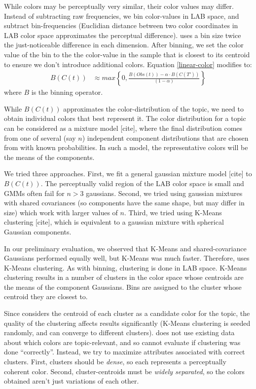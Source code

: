 While colors may be perceptually very similar, their color values may differ. Instead of subtracting raw frequencies, we bin color-values in LAB space, and subtract bin-frequencies (Euclidian distance between two color coordinates in LAB color space approximates the perceptual difference). \system uses a bin size twice the just-noticeable difference in each dimension. After binning, we set the color value of the bin to the the color-value in the sample that is closest to its centroid to ensure we don't introduce additional colors. Equation \ref{linear-color} modifies to:
\begin{align}
\label{linear-color-bin}  
B(C(t)) &\approx max\left\{0,\frac{B(Obs(t)) - \alpha \cdot B(C(T'))}{(1-\alpha)}\right\}
\end{align}
where $B$ is the binning operator.

While $B(C(t))$ approximates the color-distribution of the topic, we need to obtain individual colors that best represent it. The color distribution for a topic can be considered as a mixture model [cite], where the final distribution comes from one of several (say $n$) independent component distributions that are chosen from with known probabilities. In such a model, the representative colors will be the means of the components. 

We tried three approaches. First, we fit a general gaussian mixture model [cite] to $B(C(t))$. The perceptually valid region of the LAB color space is small and GMMs often fail for $n>3$ gaussians. Second, we tried using gaussian mixtures with shared covariances (so components have the same shape, but may differ in size) which work with larger values of $n$. Third, we tried using K-Means clustering [cite], which is equivalent to a gaussian mixture with spherical Gaussian components. 

In our preliminary evaluation, we observed that K-Means and shared-covariance Gaussians performed equally well, but K-Means was much faster. Therefore, \system uses K-Means clustering. As with binning, clustering is done in LAB space. K-Means clustering results in a number of clusters in the color space whose centroids are the means of the component Gaussians. Bins are assigned to the cluster whose centroid they are closest to. 

Since \system considers the centroid of each cluster as a candidate color for the topic, the quality of the clustering affects results significantly (K-Means clustering is seeded randomly, and can converge to different clusters). \system does not use existing data about which colors are topic-relevant, and so cannot evaluate if clustering was done ``correctly''. Instead, we try to maximize attributes associated with correct clusters. First, clusters should be \textit{dense}, so each represents a perceptually coherent color. Second, cluster-centroids must be \textit{widely separated}, so the colors obtained aren't just variations of each other. 

